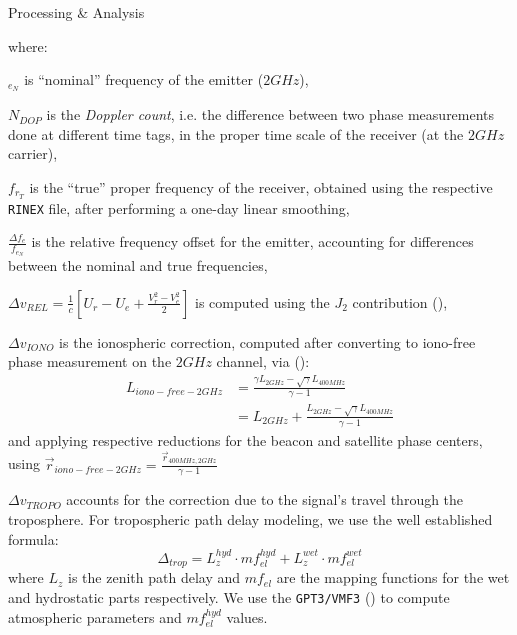\documentclass[final,a0,portrait]{beamer}
\newlength{\onecolwid}
\begin{document}
\begin{frame}[t]
\begin{columns}[t]
\begin{column}{\onecolwid}
\begin{block}{Processing \& Analysis}
{where:

\begin{description}
  \item $_{e_N}$ is ``nominal'' frequency of the emitter ($2GHz$),
%
  \item $N_{DOP}$ is the \emph{Doppler count}, i.e. the difference between two 
  phase measurements done at diﬀerent time tags, in the proper time scale of 
  the receiver (at the $2GHz$ carrier),
%
  \item $f_{r_T}$ is the ``true'' proper frequency of the receiver, obtained 
  using the respective \texttt{RINEX} file, after performing a one-day linear 
  smoothing,
%
  \item $\frac{\Delta f_e}{f_{e_N}}$ is the relative frequency offset for the 
  emitter, accounting for differences between the nominal and true frequencies,
%
  \item $\Delta v_{REL} = \frac{1}{c} \left[ U_{r} - U_{e} + \frac{V^2_r - V^2_e}{2} \right]$ is computed using the $J_2$ contribution (\cite{lemoine-2016}),
%
  \item $\Delta v_{IONO}$ is the ionospheric correction, computed after 
  converting to iono-free phase measurement on the $2GHz$ channel, via 
  (\cite{lemoine-2016}):
  \begin{equation}
    \begin{aligned}
      L_{iono-free-2GHz} &= \frac{\gamma L_{2GHz} -
          \sqrt{\gamma}L_{400MHz}}{\gamma - 1} \\
                     &= L_{2GHz} + \frac{L_{2GHz} -
                        \sqrt{\gamma}L_{400MHz}}{\gamma - 1}
    \end{aligned}
  \end{equation}
  and applying respective reductions for the beacon and satellite phase centers, 
  using $\vec{r}_{iono-free-2GHz} = \frac{\vec{r}_{400MHz,2GHz}}{\gamma - 1}$

  \item $\Delta v_{TROPO}$ accounts for the correction due to the signal's travel 
  through the troposphere. For tropospheric path delay modeling, we use the 
  well established formula:
  \begin{equation}
    \Delta _{trop} = L_{z}^{hyd} \cdot mf_{el}^{hyd} + L_{z}^{wet} \cdot mf_{el}^{wet}
  \end{equation}
  where $L_{z}$ is the zenith path delay and $mf_{el}$ are the mapping functions 
  for the wet and hydrostatic parts respectively. We use the \texttt{GPT3/VMF3} 
  (\cite{Landskron2018}) to compute atmospheric parameters and $mf_{el}^{hyd}$ 
  values.


\end{description}}
\end{block}
\end{column}
\end{columns}
\end{frame}
\end{document}
